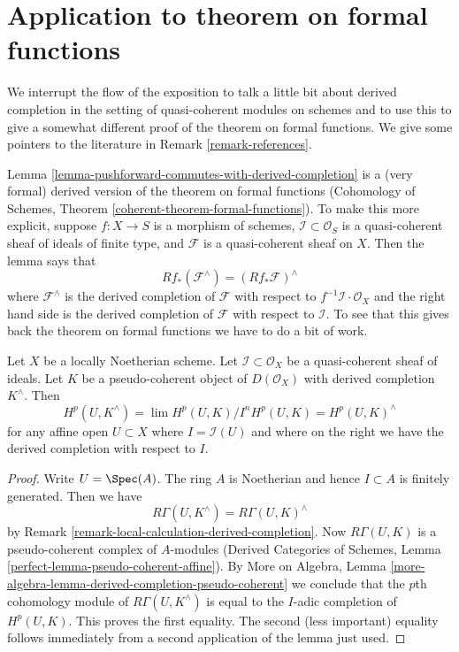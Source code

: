 \section{Application to theorem on formal functions}
\label{section-formal-functions}

\noindent
We interrupt the flow of the exposition to talk a little bit about
derived completion in the setting of quasi-coherent modules on schemes
and to use this to give a somewhat different proof of the theorem on
formal functions. We give some pointers to the literature in
Remark \ref{remark-references}.

\medskip\noindent
Lemma \ref{lemma-pushforward-commutes-with-derived-completion} is a
(very formal) derived version of the theorem on formal functions
(Cohomology of Schemes, Theorem \ref{coherent-theorem-formal-functions}).
To make this more explicit, suppose $f : X \to S$ is a morphism of schemes,
$\mathcal{I} \subset \mathcal{O}_S$ is a quasi-coherent sheaf of ideals
of finite type,
and $\mathcal{F}$ is a quasi-coherent sheaf on $X$. Then the lemma says that
\begin{equation}
\label{equation-formal-functions}
Rf_*(\mathcal{F}^\wedge) = (Rf_*\mathcal{F})^\wedge
\end{equation}
where $\mathcal{F}^\wedge$ is the derived completion of $\mathcal{F}$
with respect to $f^{-1}\mathcal{I} \cdot \mathcal{O}_X$ and the right
hand side is the derived completion of $\mathcal{F}$
with respect to $\mathcal{I}$. To see that this gives back the theorem
on formal functions we have to do a bit of work.

\begin{lemma}
\label{lemma-sections-derived-completion-pseudo-coherent}
Let $X$ be a locally Noetherian scheme. Let $\mathcal{I} \subset \mathcal{O}_X$
be a quasi-coherent sheaf of ideals. Let $K$ be a
pseudo-coherent object of $D(\mathcal{O}_X)$ with derived completion
$K^\wedge$. Then
$$
H^p(U, K^\wedge) = \lim H^p(U, K)/I^nH^p(U, K) =
H^p(U, K)^\wedge
$$
for any affine open $U \subset X$
where $I = \mathcal{I}(U)$ and where on the right we have the derived
completion with respect to $I$.
\end{lemma}

\begin{proof}
Write $U = \Spec(A)$. The ring $A$ is Noetherian
and hence $I \subset A$ is finitely generated. Then we have
$$
R\Gamma(U, K^\wedge) = R\Gamma(U, K)^\wedge
$$
by Remark \ref{remark-local-calculation-derived-completion}.
Now $R\Gamma(U, K)$ is a pseudo-coherent complex of $A$-modules
(Derived Categories of Schemes, Lemma
\ref{perfect-lemma-pseudo-coherent-affine}).
By More on Algebra, Lemma
\ref{more-algebra-lemma-derived-completion-pseudo-coherent}
we conclude that the $p$th cohomology module of $R\Gamma(U, K^\wedge)$
is equal to the $I$-adic completion of $H^p(U, K)$.
This proves the first equality. The second (less important) equality
follows immediately from a second application of the lemma just used.
\end{proof}

